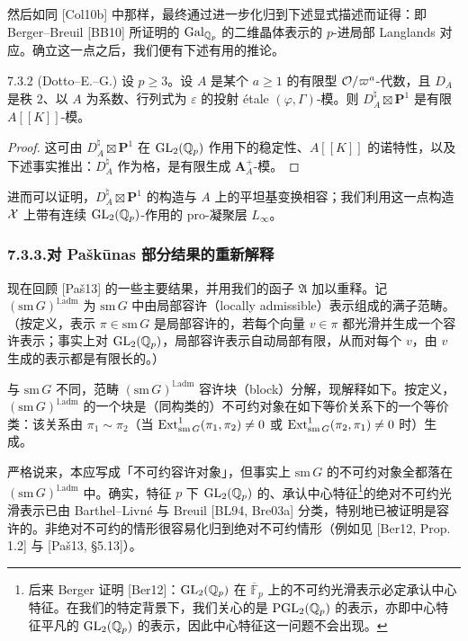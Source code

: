 然后如同 [Col10b] 中那样，最终通过进一步化归到下述显式描述而证得：即 Berger--Breuil [BB10] 所证明的 $\operatorname{Gal}_{\mathbb{Q}_p}$ 的二维晶体表示的 $p$-进局部 Langlands 对应。确立这一点之后，我们便有下述有用的推论。

\begin{cor}{7.3.2 (Dotto--E.--G.)}\label{thm:a4-7-3-2}
设 $p\ge3$。设 $A$ 是某个 $a\ge1$ 的有限型 $\mathcal{O}/\varpi^a$-代数，且 $D_A$ 是秩 $2$、以 $A$ 为系数、行列式为 $\varepsilon$ 的投射 étale $(\varphi,\Gamma)$-模。则 $D_A^\natural\boxtimes\mathbf P^1$ 是有限 $A[[K]]$-模。
\end{cor}

\begin{proof}
这可由 $D_A^\natural\boxtimes\mathbf P^1$ 在 $\mathrm{GL}_2(\mathbb{Q}_p)$ 作用下的稳定性、$A[[K]]$ 的诺特性，以及下述事实推出：$D_A^\natural$ 作为格，是有限生成 $\mathbf A_A^+$-模。
\end{proof}

进而可以证明，$D_A^\natural\boxtimes\mathbf P^1$ 的构造与 $A$ 上的平坦基变换相容；我们利用这一点构造 $\mathcal{X}$ 上带有连续 $\mathrm{GL}_2(\mathbb{Q}_p)$-作用的 pro-凝聚层 $L_\infty$。

\subsubsection*{7.3.3.\quad 对 Paškūnas 部分结果的重新解释}
现在回顾 [Paš13] 的一些主要结果，并用我们的函子 $\mathfrak A$ 加以重释。记 $(\mathrm{sm}\,G)^{\mathrm{l.adm}}$ 为 $\mathrm{sm}\,G$ 中由局部容许（locally admissible）表示组成的满子范畴。（按定义，表示 $\pi\in\mathrm{sm}\,G$ 是局部容许的，若每个向量 $v\in\pi$ 都光滑并生成一个容许表示；事实上对 $\mathrm{GL}_2(\mathbb{Q}_p)$，局部容许表示自动局部有限，从而对每个 $v$，由 $v$ 生成的表示都是有限长的。）

与 $\mathrm{sm}\,G$ 不同，范畴 $(\mathrm{sm}\,G)^{\mathrm{l.adm}}$ 容许块（block）分解，现解释如下。按定义，$(\mathrm{sm}\,G)^{\mathrm{l.adm}}$ 的一个块是（同构类的）不可约对象在如下等价关系下的一个等价类：该关系由 $\pi_1\sim\pi_2$（当 $\operatorname{Ext}^1_{\mathrm{sm}\,G}(\pi_1,\pi_2)\neq0$ 或 $\operatorname{Ext}^1_{\mathrm{sm}\,G}(\pi_2,\pi_1)\neq0$ 时）生成。

严格说来，本应写成「不可约容许对象」，但事实上 $\mathrm{sm}\,G$ 的不可约对象全都落在 $(\mathrm{sm}\,G)^{\mathrm{l.adm}}$ 中。确实，特征 $p$ 下 $\mathrm{GL}_2(\mathbb{Q}_p)$ 的、承认中心特征\footnote{后来 Berger 证明 [Ber12]：$\mathrm{GL}_2(\mathbb{Q}_p)$ 在 $\overline{\mathbb F}_p$ 上的不可约光滑表示必定承认中心特征。在我们的特定背景下，我们关心的是 $\mathrm{PGL}_2(\mathbb{Q}_p)$ 的表示，亦即中心特征平凡的 $\mathrm{GL}_2(\mathbb{Q}_p)$ 的表示，因此中心特征这一问题不会出现。}的绝对不可约光滑表示已由 Barthel--Livné 与 Breuil [BL94, Bre03a] 分类，特别地已被证明是容许的。非绝对不可约的情形很容易化归到绝对不可约情形（例如见 [Ber12, Prop. 1.2] 与 [Paš13, §5.13]）。

